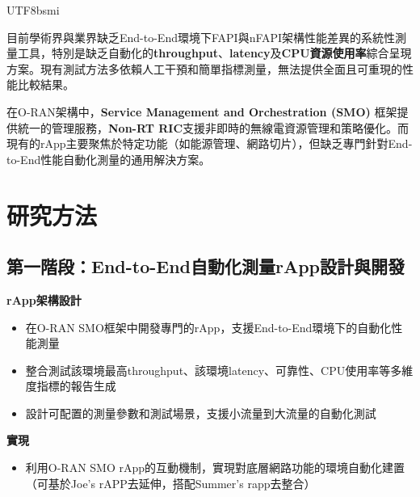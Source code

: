 \documentclass[conference]{IEEEtran}
\begin{document}
\begin{CJK}{UTF8}{bsmi}
{\vspace{1em}

目前學術界與業界缺乏End-to-End環境下FAPI與nFAPI架構性能差異的系統性測量工具，特別是缺乏自動化的\textbf{throughput}、\textbf{latency}及\textbf{CPU資源使用率}綜合呈現方案。現有測試方法多依賴人工干預和簡單指標測量，無法提供全面且可重現的性能比較結果。

\vspace{1em}

在O-RAN架構中，\textbf{Service Management and Orchestration (SMO)} 框架提供統一的管理服務，\textbf{Non-RT RIC}支援非即時的無線電資源管理和策略優化。而現有的rApp主要聚焦於特定功能（如能源管理、網路切片），但缺乏專門針對End-to-End性能自動化測量的通用解決方案。




\section{研究方法}

\subsection{第一階段：End-to-End自動化測量rApp設計與開發}
\textbf{rApp架構設計}
\begin{itemize}
    \item 在O-RAN SMO框架中開發專門的rApp，支援End-to-End環境下的自動化性能測量
    \item 整合測試該環境最高throughput、該環境latency、可靠性、CPU使用率等多維度指標的報告生成
    \item 設計可配置的測量參數和測試場景，支援小流量到大流量的自動化測試
\end{itemize}

\textbf{實現}
\begin{itemize}
    \item 利用O-RAN SMO rApp的互動機制，實現對底層網路功能的環境自動化建置（可基於Joe's rAPP去延伸，搭配Summer's rapp去整合）
\end{itemize}

}
\end{CJK}
\end{document}
